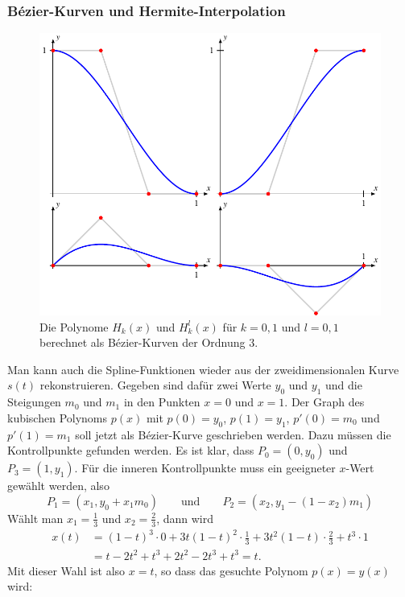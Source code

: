 %
%
\subsubsection{Bézier-Kurven und Hermite-Interpolation}
\begin{figure}
\centering
\includegraphics{chapters/30-interpolation/figures/bezierhermite.pdf}
\caption{Die Polynome $H_k(x)$ und $H_k^l(x)$ für $k=0,1$ und $l=0,1$
berechnet als Bézier-Kurven der Ordnung 3.
\label{buch:bezier:figure:bezierhermite}}
\end{figure}
Man kann auch die Spline-Funktionen wieder aus der zweidimensionalen
Kurve $s(t)$ rekonstruieren.
Gegeben sind dafür zwei Werte $y_0$ und $y_1$ und die Steigungen $m_0$ und
$m_1$ in den Punkten $x=0$ und $x=1$.
Der Graph des kubischen Polynoms $p(x)$ mit $p(0)=y_0$, $p(1)=y_1$,
$p'(0)=m_0$ und $p'(1)=m_1$ soll jetzt als Bézier-Kurve geschrieben werden.
Dazu müssen die Kontrollpunkte gefunden werden.
Es ist klar, dass $P_0=(0,y_0)$ und $P_3=(1,y_1)$.
Für die inneren Kontrollpunkte muss ein geeigneter $x$-Wert gewählt werden,
also
\[
P_1=
(x_1,y_0+x_1m_0)
\qquad
\text{und}
\qquad
P_2
=
(x_2,y_1-(1-x_2)m_1)
\]
Wählt man $x_1=\frac13$ und $x_2=\frac23$, dann wird
\begin{align*}
x(t)
&=
(1-t)^3\cdot 0 + 3t(1-t)^2\cdot \frac13 + 3t^2(1-t)\cdot \frac23 + t^3\cdot 1
\\
&=
t-2t^2+t^3 + 2t^2 -2t^3 + t^3 = t.
\end{align*}
Mit dieser Wahl ist also $x=t$, so dass das gesuchte Polynom $p(x)=y(x)$ wird:
